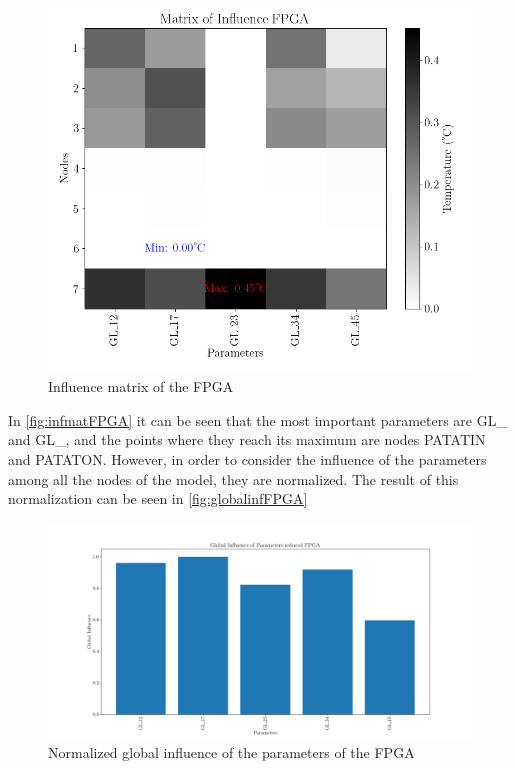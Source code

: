  \begin{figure}[H]
     \centering
     \includegraphics[width=\textwidth]{Figures/FPGA/FPGA-redinfmat.png}
     \caption{Influence matrix of the FPGA}
     \label{fig:infmatFPGA}
 \end{figure}

 In \autoref{fig:infmatFPGA} it can be seen that the most important parameters are GL\_ and GL\_, and the points where they reach its maximum are nodes PATATIN and PATATON. However, in order to consider the influence of the parameters among all the nodes of the model, they are normalized. The result of this normalization can be seen in \autoref{fig:globalinfFPGA}

 \begin{figure}[H]
     \centering
     \includegraphics[width=\textwidth]{Figures/FPGA/FPGA-redinfglobal.png}
     \caption{Normalized global influence of the parameters of the FPGA}
     \label{fig:globalinfFPGA}
 \end{figure}

